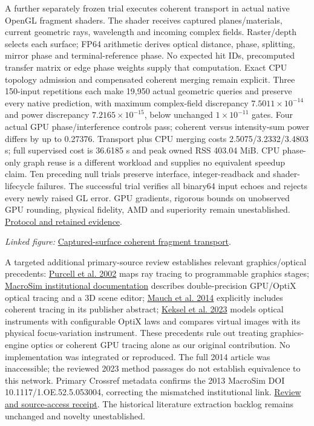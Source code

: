 \documentclass[11pt]{article}
\begin{document}
A further separately frozen trial executes coherent transport in actual native OpenGL fragment shaders. The shader receives captured planes/materials, current geometric rays, wavelength and incoming complex fields. Raster/depth selects each surface; FP64 arithmetic derives optical distance, phase, splitting, mirror phase and terminal-reference phase. No expected hit IDs, precomputed transfer matrix or edge phase weights supply that computation. Exact CPU topology admission and compensated coherent merging remain explicit. Three 150-input repetitions each make 19,950 actual geometric queries and preserve every native prediction, with maximum complex-field discrepancy $7.5011\times10^{-14}$ and power discrepancy $7.2165\times10^{-15}$, below unchanged $1\times10^{-11}$ gates. Four actual GPU phase/interference controls pass; coherent versus intensity-sum power differs by up to 0.27376. Transport plus CPU merging costs 2.5075/3.2332/3.4803 s; full supervised cost is 36.6185 s and peak owned RSS 403.04 MiB. CPU phase-only graph reuse is a different workload and supplies no equivalent speedup claim. Ten preceding null trials preserve interface, integer-readback and shader-lifecycle failures. The successful trial verifies all binary64 input echoes and rejects every newly raised GL error. GPU gradients, rigorous bounds on unobserved GPU rounding, physical fidelity, AMD and superiority remain unestablished. \href{https://github.com/Agnuxo1/Neuro3D/blob/a6d0fbec5011bdc76abad71edac86519016348f4/Docs/NATIVE\_GRAPHICS\_COHERENT\_FIELD\_PROTOCOL\_2026-10-09.md}{Protocol and retained evidence}.

\noindent\textit{Linked figure: }\href{https://github.com/Agnuxo1/Neuro3D/blob/a6d0fbec5011bdc76abad71edac86519016348f4/Docs/assets/native-graphics-coherent-fields-2026-10-09.png}{Captured-surface coherent fragment transport}.

A targeted additional primary-source review establishes relevant graphics/optical precedents: \href{https://graphics.stanford.edu/papers/rtongfx/}{Purcell et al. 2002} maps ray tracing to programmable graphics stages; \href{https://www.ito.uni-stuttgart.de/en/research/group-3do/macrosim/}{MacroSim institutional documentation} describes double-precision GPU/OptiX optical tracing and a 3D scene editor; \href{https://opg.optica.org/abstract.cfm?URI=IODC-2014-IW1A.4}{Mauch et al. 2014} explicitly includes coherent tracing in its publisher abstract; \href{https://arxiv.org/html/2308.04816v1}{Keksel et al. 2023} models optical instruments with configurable OptiX laws and compares virtual images with its physical focus-variation instrument. These precedents rule out treating graphics-engine optics or coherent GPU tracing alone as our original contribution. No implementation was integrated or reproduced. The full 2014 article was inaccessible; the reviewed 2023 method passages do not establish equivalence to this network. Primary Crossref metadata confirms the 2013 MacroSim DOI 10.1117/1.OE.52.5.053004, correcting the mismatched institutional link. \href{https://github.com/Agnuxo1/Neuro3D/blob/a6d0fbec5011bdc76abad71edac86519016348f4/Docs/GRAPHICS\_OPTICAL\_PRIORS\_2026-10-09.md}{Review and source-access receipt}. The historical literature extraction backlog remains unchanged and novelty unestablished.
\end{document}
